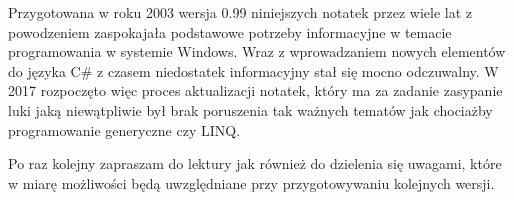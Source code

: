 Przygotowana w roku 2003 wersja 0.99 niniejszych notatek przez wiele lat z powodzeniem zaspokajała podstawowe
potrzeby informacyjne w temacie programowania w systemie Windows. Wraz z wprowadzaniem nowych elementów do języka C\#
z czasem niedostatek informacyjny stał się mocno odczuwalny. W 2017 rozpoczęto więc proces aktualizacji notatek, który 
ma za zadanie zasypanie luki jaką niewątpliwie był brak poruszenia tak ważnych tematów jak chociażby programowanie generyczne
czy LINQ. 

Po raz kolejny zapraszam do lektury jak również do dzielenia się uwagami, które w miarę możliwości będą uwzględniane
przy przygotowywaniu kolejnych wersji.